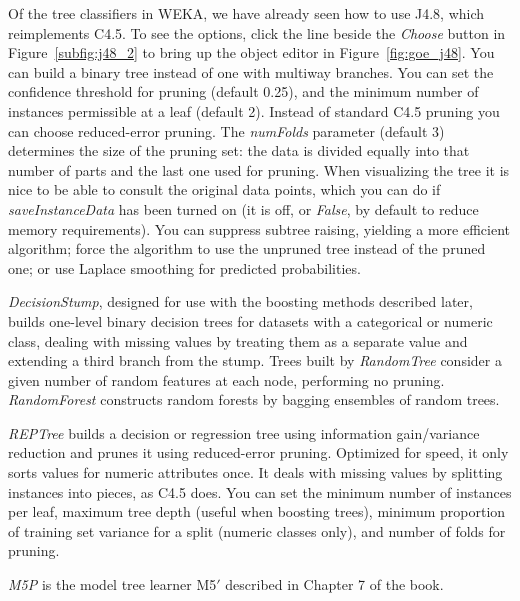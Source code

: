 Of the tree classifiers in WEKA, we have already seen how to use J4.8,
which reimplements C4.5. To see the options, click the line beside the
\textit{Choose} button in Figure~\ref{subfig:j48_2} to bring up the
object editor in Figure~\ref{fig:goe_j48}. You can build a binary tree
instead of one with multiway branches. You can set the confidence
threshold for pruning (default 0.25), and the minimum number of
instances permissible at a leaf (default 2). Instead of standard C4.5
pruning you can choose reduced-error pruning. The \textit{numFolds}
parameter (default 3) determines the size of the pruning set: the data
is divided equally into that number of parts and the last one used for
pruning. When visualizing the tree it is nice to be able to consult
the original data points, which you can do if
\textit{saveInstanceData} has been turned on (it is off, or
\textit{False}, by default to reduce memory requirements). You can
suppress subtree raising, yielding a more efficient algorithm; force
the algorithm to use the unpruned tree instead of the pruned one; or
use Laplace smoothing for predicted probabilities.

\textit{DecisionStump}, designed for use with the boosting methods
described later, builds one-level binary decision trees for datasets
with a categorical or numeric class, dealing with missing values by
treating them as a separate value and extending a third branch from
the stump. Trees built by \textit{RandomTree} consider a given number of
random features at each node, performing no
pruning. \textit{RandomForest} constructs random forests by bagging
ensembles of random trees.

\textit{REPTree} builds a decision or regression tree using
information gain/variance reduction and prunes it using reduced-error
pruning. Optimized for speed, it only sorts values for numeric
attributes once. It deals with missing values
by splitting instances into pieces, as C4.5 does. You can set the
minimum number of instances per leaf, maximum tree depth (useful when
boosting trees), minimum proportion of training set variance for a
split (numeric classes only), and number of folds for pruning.

\textit{M5P} is the model tree learner M5$\prime$ described in Chapter 7 of the book.

